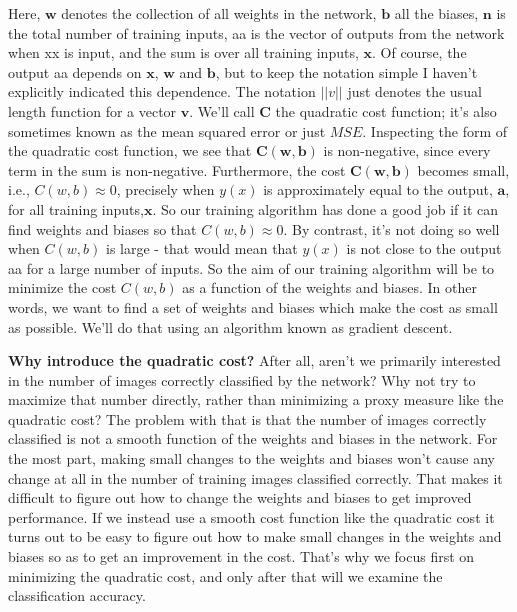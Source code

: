 \documentclass[a4paper,12pt]{report}%
\begin{document}
Here, $\mathbf{w}$ denotes the collection of all weights in the network, $\mathbf{b}$ all the biases, $\mathbf{n}$ is the total number of training inputs, aa is the vector of outputs from the network when xx is input, and the sum is over all training inputs, $\mathbf{x}$. Of course, the output aa depends on $\mathbf{x}$, $\mathbf{w}$ and $\mathbf{b}$, but to keep the notation simple I haven't explicitly indicated this dependence. The notation $||v||$ just denotes the usual length function for a vector $\mathbf{v}$. We'll call $\mathbf{C}$ the quadratic cost function; it's also sometimes known as the mean squared error or just $MSE$. Inspecting the form of the quadratic cost function, we see that $\mathbf{C(w,b)}$ is non-negative, since every term in the sum is non-negative. Furthermore, the cost $\mathbf{C(w,b)}$ becomes small, i.e., $C(w,b) \approx 0$, precisely when $y(x)$ is approximately equal to the output, $\mathbf{a}$, for all training inputs,$\mathbf{x}$. So our training algorithm has done a good job if it can find weights and biases so that $C(w,b) \approx 0$. By contrast, it's not doing so well when $C(w,b)$ is large - that would mean that $y(x)$ is not close to the output aa for a large number of inputs. So the aim of our training algorithm will be to minimize the cost $C(w,b)$ as a function of the weights and biases. In other words, we want to find a set of weights and biases which make the cost as small as possible. We'll do that using an algorithm known as gradient descent.

\smallskip

{\bf Why introduce the quadratic cost?} After all, aren't we primarily interested in the number of images correctly classified by the network? Why not try to maximize that number directly, rather than minimizing a proxy measure like the quadratic cost? The problem with that is that the number of images correctly classified is not a smooth function of the weights and biases in the network. For the most part, making small changes to the weights and biases won't cause any change at all in the number of training images classified correctly. That makes it difficult to figure out how to change the weights and biases to get improved performance. If we instead use a smooth cost function like the quadratic cost it turns out to be easy to figure out how to make small changes in the weights and biases so as to get an improvement in the cost. That's why we focus first on minimizing the quadratic cost, and only after that will we examine the classification accuracy.
\end{document}
